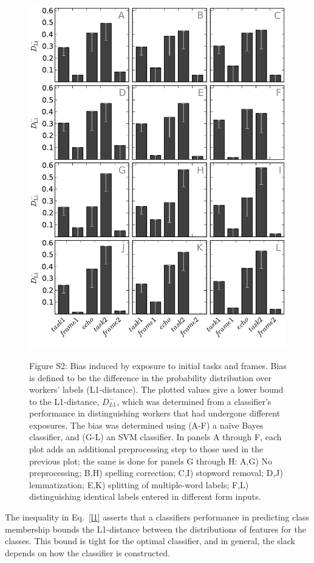 \documentclass[12pt]{article}
\begin{document}
\begin{figure}
	\centering
	\includegraphics[scale=0.75]{figs/theta_sup.pdf}
	\label{fig:theta_sup}
	\caption{
		Figure S2: Bias induced by exposure to initial tasks and frames.
		Bias is defined to be the difference in the probability 
		distribution over workers' labels (L1-distance).  The plotted values
		give a lower bound to the L1-distance, $D_{L1}^-$, which was 
		determined from a classifier's performance in 
		distinguishing workers that had undergone different exposures.
		The bias was determined using (A-F) a na\"ive Bayes classifier, and 
		(G-L) an SVM classifier.
		In panels A through F, each plot adds an additional
		preprocessing step to those used in the previous plot; the same is 
		done for panels G through H: A,G) No 
		preprocessing; B,H) spelling correction; C,I) stopword removal; 
		D,J) lemmatization; E,K) splitting of multiple-word labels; 
		F,L) distinguishing identical labels entered in different form inputs.
	}
\end{figure}
The inequality in Eq.~\ref{l1}
asserts that a classifiers performance in predicting class membership
bounds the L1-distance between the distributions of features for the classes.
This bound is tight for the optimal classifier, and in general, the slack
depends on how the classifier is constructed.
\end{document}

